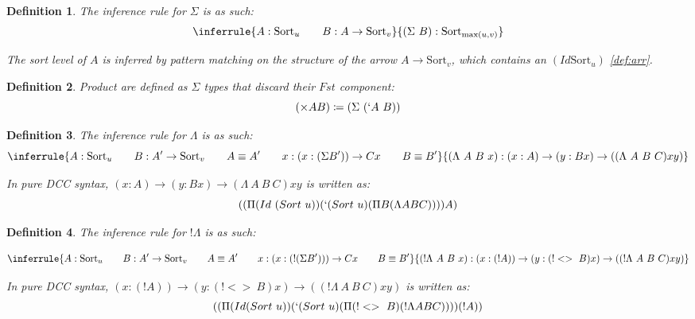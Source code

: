 \documentclass{article}
\newtheorem{definition}{Definition}
\newcommand{\arr}{\rightarrow}
\newcommand{\sort}[1]{\text{Sort}_{#1}}
\begin{document}
\begin{definition}
  The inference rule for \(\Sigma\) is as such:
  \begin{equation}
    \inferrule
    { A : \sort{u} \qquad B : A \arr \sort{v}}
    { (\Sigma\ B) : \sort{\max(u, v)}}
  \end{equation}

  The sort level of \(A\) is inferred by pattern matching on the structure of the arrow \(A \arr \sort{v}\), which contains an \((Id \sort{u})\) \ref{def:arr}.
\end{definition}

\begin{definition}
  Product are defined as \(\Sigma\) types that discard their \(Fst\) component:
  \begin{equation}
    (\times A B) \coloneq (\Sigma\ (`A\ B))
  \end{equation}
\end{definition}

\begin{definition}
  The inference rule for \(\Lambda\) is as such:
  \begin{equation}
    \inferrule
    { A : \sort{u} \qquad B : A' \arr \sort{v} \qquad A \equiv A' \qquad x : (x : (\Sigma B')) \arr C x \qquad B \equiv B'}
    { (\Lambda\ A\ B\ x) : (x : A) \arr (y : B x) \arr ((\Lambda\ A\ B\ C) x y)}
  \end{equation}

  In pure DCC syntax, \((x : A) \arr (y : B x) \arr (\Lambda\ A\ B\ C) x y\) is written as:
  \begin{equation}
    ((\Pi (Id\ (Sort\ u)) (`(Sort\ u) (\Pi B (\Lambda A B C)))) A)
  \end{equation}
\end{definition}

\begin{definition}
  The inference rule for \(!\Lambda\) is as such:

  \begin{equation}
    \inferrule
    { A : \sort{u} \qquad B : A' \arr \sort{v} \qquad A \equiv A' \qquad x : (x : (! (\Sigma B'))) \arr C x \qquad B \equiv B'}
    { (!\Lambda\ A\ B\ x) : (x : (! A)) \arr (y : (!<>\ B) x) \arr ((!\Lambda\ A\ B\ C) x y)}
  \end{equation}

  In pure DCC syntax, \((x : (! A)) \arr (y : (!<>\ B) x) \arr ((!\Lambda\ A\ B\ C) x y)\) is written as:
  \begin{equation}
    ((\Pi (Id (Sort\ u)) (`(Sort\ u) (\Pi (!<>\ B) (!\Lambda A B C)))) (! A))
  \end{equation}
\end{definition}
\end{document}
